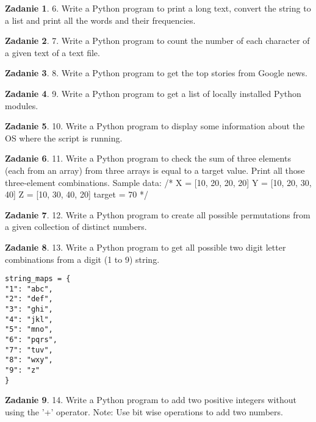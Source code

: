 \documentclass[11pt]{article}
\theoremstyle{definition}
\newtheorem{zadanie}{Zadanie}
\begin{document}
\begin{zadanie}
6. Write a Python program to print a long text, convert the string to a list and print all the words and their frequencies.
\end{zadanie}

\begin{zadanie}
7. Write a Python program to count the number of each character of a given text of a text file.
\end{zadanie}

\begin{zadanie}
8. Write a Python program to get the top stories from Google news.
\end{zadanie}

\begin{zadanie}
9. Write a Python program to get a list of locally installed Python modules.
\end{zadanie}

\begin{zadanie}
10. Write a Python program to display some information about the OS where the script is running.
\end{zadanie}

\begin{zadanie}
11. Write a Python program to check the sum of three elements (each from an array) from three arrays is equal to a target value. Print all those three-element combinations.
Sample data:
/*
X = [10, 20, 20, 20]
Y = [10, 20, 30, 40]
Z = [10, 30, 40, 20]
target = 70
*/
\end{zadanie}

\begin{zadanie}
12. Write a Python program to create all possible permutations from a given collection of distinct numbers.
\end{zadanie}

\begin{zadanie}
13. Write a Python program to get all possible two digit letter combinations from a digit (1 to 9) string.
\begin{verbatim}
string_maps = {
"1": "abc",
"2": "def",
"3": "ghi",
"4": "jkl",
"5": "mno",
"6": "pqrs",
"7": "tuv",
"8": "wxy",
"9": "z"
}
\end{verbatim}
\end{zadanie}

\begin{zadanie}
14. Write a Python program to add two positive integers without using the '+' operator.
Note: Use bit wise operations to add two numbers.
\end{zadanie}
\end{document}
